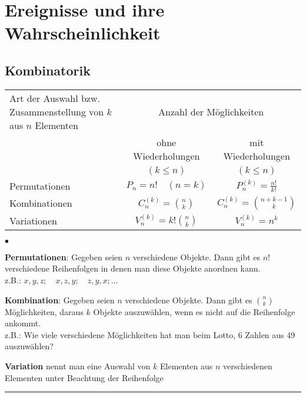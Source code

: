 \section{Ereignisse und ihre Wahrscheinlichkeit}

\subsection{Kombinatorik  }
\begin{tabular}{| p{5.5cm} | c | c |}
  \hline
  Art der Auswahl bzw. Zusammenstellung von $k$ aus $n$ Elementen &
  \multicolumn{2}{|c|}{Anzahl der Möglichkeiten} \\
  & ohne Wiederholungen & mit Wiederholungen \\
 	&	$(k\leq n)$         & $(k\leq n)$ \\
 	\hline
 	Permutationen & $P_n=n!\quad(n=k)$       & $P_n^{(k)}=\frac{n!}{k!}$ \\
 	Kombinationen & $C_n^{(k)}=\binom n k$   & $C_n^{(k)}=\binom{n+k-1} k$ \\
  Variationen   & $V_n^{(k)}=k!\binom n k$ & $V_n^{(k)}=n^k$\\
  \hline
\end{tabular}
\begin{list}{$\bullet$}{\setlength{\itemsep}{0cm} \setlength{\parsep}{0cm}
\setlength{\topsep}{0.1cm}}
  \item \textbf{Permutationen}: Gegeben seien $n$ verschiedene Objekte. Dann
    gibt es $n!$ verschiedene Reihenfolgen in denen man diese Objekte anordnen
    kann. \\
    z.B.: $x,y,z;\quad x,z,y;\quad z,y,x;\ldots$
  \item \textbf{Kombination}: Gegeben seien $n$ verschiedene Objekte. Dann gibt
    es $\binom n k$ Möglichkeiten, daraus $k$ Objekte auszuwählen, wenn es nicht
    auf die Reihenfolge ankommt. \\
    z.B.: Wie viele verschiedene Möglichkeiten hat man beim Lotto, 6 Zahlen aus
    49 auszuwählen?
  \item \textbf{Variation} nennt man eine Auswahl von $k$ Elementen aus $n$
    verschiedenen Elementen unter Beachtung der Reihenfolge
\end{list}
\hrule

